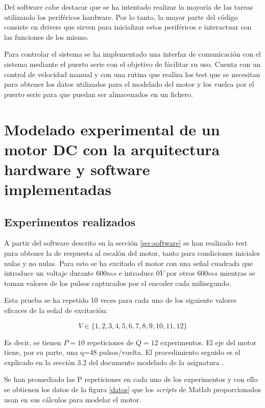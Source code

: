 \documentclass[a4paper]{article}
\begin{document}
Del software cabe destacar que se ha intentado realizar la mayoría de las tareas utilizando los periféricos hardware. Por lo tanto,
la mayor parte del código consiste en drivers que sirven para inicializar estos periféricos e interactuar con las funciones de los mismo.

Para controlar el sistema se ha implementado una interfaz de comunicación con el sistema mediante el puerto serie con el objetivo de fácilitar su uso.
Cuenta con un control de velocidad manual y con una rutina que realiza los test que se necesitan para obtener los datos utilizados para el modelado del motor y los vuelca
por el puerto serie para que puedan ser almacenados en un fichero.

\section{Modelado experimental de un motor DC con la arquitectura hardware y software implementadas}
\subsection{Experimentos realizados \label{sec:exp}}
A partir del software descrito en la sección \ref{sec:software} se han realizado test para obtener la de respuesta al escalón del motor,
tanto para condiciones iniciales nulas y no nulas.
Para esto se ha excitado el motor con una señal cuadrada que introduce un voltaje durante $600ms$ e introduce $0V$ por otros $600ms$
mientras se toman valores de los pulsos capturados por el encoder cada milisegundo.

Esta prueba se ha repetido 10 veces para cada uno de los siguiente valores eficaces de la señal de excitación:

\begin{displaymath}
V \in \{1,2,3,4,5,6,7,8,9,10,11,12\}
\end{displaymath}

Es decir, se tienen $P=10$ repeticiones de $Q=12$ experimentos. El eje del motor tiene, por su parte, una q=48 pulsos/vuelta.
El procedimiento seguido es el explicado en la sección 3.2 del documento modelado de la asignatura \cite{modelado}.

Se han promediado las P repeticiones en cada uno de los experimentos y con ello se obtienen los datos de la figura \ref{datos} que los \emph{scripts}
de Matlab proporcionados usan en sus cálculos para modelar el motor.
\end{document}
